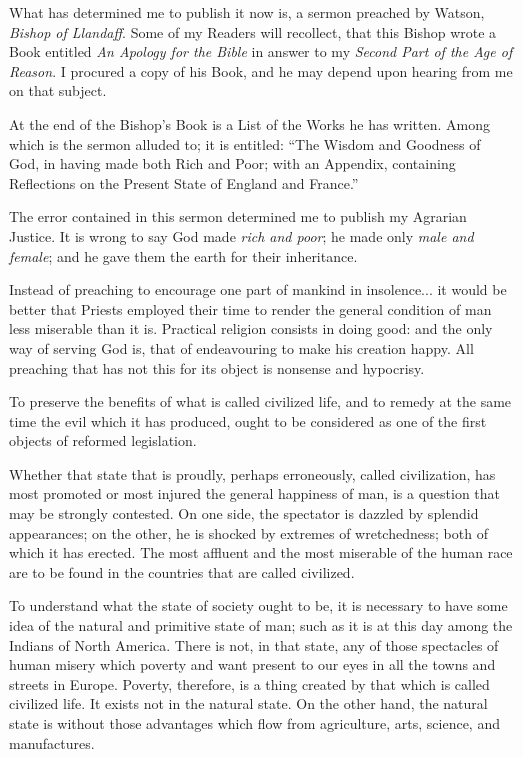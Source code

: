 What has determined me to publish it now is, a sermon preached by Watson, \textit{Bishop of Llandaff}. Some of my Readers will recollect, that this Bishop wrote a Book entitled \textit{An Apology for the Bible} in answer to my \textit{Second Part of the Age of Reason}. I procured a copy of his Book, and he may depend upon hearing from me on that subject.\par

At the end of the Bishop’s Book is a List of the Works he has written. Among which is the sermon alluded to; it is entitled: “The Wisdom and Goodness of God, in having made both Rich and Poor; with an Appendix, containing Reflections on the Present State of England and France.”\par

The error contained in this sermon determined me to publish my Agrarian Justice. It is wrong to say God made \textit{rich and poor}; he made only \textit{male and female}; and he gave them the earth for their inheritance.\par

Instead of preaching to encourage one part of mankind in insolence... it would be better that Priests employed their time to render the general condition of man less miserable than it is. Practical religion consists in doing good: and the only way of serving God is, that of endeavouring to make his creation happy. All preaching that has not this for its object is nonsense and hypocrisy.\par


To preserve the benefits of what is called civilized life, and to remedy at the same time the evil which it has produced, ought to be considered as one of the first objects of reformed legislation.\par

Whether that state that is proudly, perhaps erroneously, called civilization, has most promoted or most injured the general happiness of man, is a question that may be strongly contested. On one side, the spectator is dazzled by splendid appearances; on the other, he is shocked by extremes of wretchedness; both of which it has erected. The most affluent and the most miserable of the human race are to be found in the countries that are called civilized.\par

To understand what the state of society ought to be, it is necessary to have some idea of the natural and primitive state of man; such as it is at this day among the Indians of North America. There is not, in that state, any of those spectacles of human misery which poverty and want present to our eyes in all the towns and streets in Europe. Poverty, therefore, is a thing created by that which is called civilized life. It exists not in the natural state. On the other hand, the natural state is without those advantages which flow from agriculture, arts, science, and manufactures.\par

